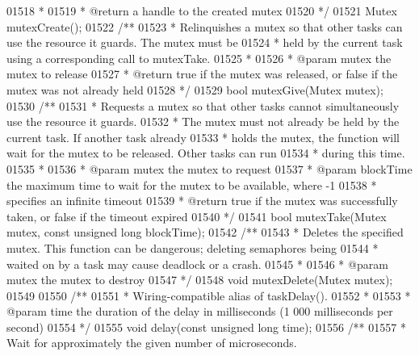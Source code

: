 \begin{DoxyCode}
{{{{{{{{{01518 \textcolor{comment}{ *}
01519 \textcolor{comment}{ * @return a handle to the created mutex}
01520 \textcolor{comment}{ */}
01521 Mutex mutexCreate();
01522 \textcolor{comment}{/**}
01523 \textcolor{comment}{ * Relinquishes a mutex so that other tasks can use the resource it guards. The mutex must be}
01524 \textcolor{comment}{ * held by the current task using a corresponding call to mutexTake.}
01525 \textcolor{comment}{ *}
01526 \textcolor{comment}{ * @param mutex the mutex to release}
01527 \textcolor{comment}{ * @return true if the mutex was released, or false if the mutex was not already held}
01528 \textcolor{comment}{ */}
01529 \textcolor{keywordtype}{bool} mutexGive(Mutex mutex);
01530 \textcolor{comment}{/**}
01531 \textcolor{comment}{ * Requests a mutex so that other tasks cannot simultaneously use the resource it guards.}
01532 \textcolor{comment}{ * The mutex must not already be held by the current task. If another task already}
01533 \textcolor{comment}{ * holds the mutex, the function will wait for the mutex to be released. Other tasks can run}
01534 \textcolor{comment}{ * during this time.}
01535 \textcolor{comment}{ *}
01536 \textcolor{comment}{ * @param mutex the mutex to request}
01537 \textcolor{comment}{ * @param blockTime the maximum time to wait for the mutex to be available, where -1}
01538 \textcolor{comment}{ * specifies an infinite timeout}
01539 \textcolor{comment}{ * @return true if the mutex was successfully taken, or false if the timeout expired}
01540 \textcolor{comment}{ */}
01541 \textcolor{keywordtype}{bool} mutexTake(Mutex mutex, \textcolor{keyword}{const} \textcolor{keywordtype}{unsigned} \textcolor{keywordtype}{long} blockTime);
01542 \textcolor{comment}{/**}
01543 \textcolor{comment}{ * Deletes the specified mutex. This function can be dangerous; deleting semaphores being}
01544 \textcolor{comment}{ * waited on by a task may cause deadlock or a crash.}
01545 \textcolor{comment}{ *}
01546 \textcolor{comment}{ * @param mutex the mutex to destroy}
01547 \textcolor{comment}{ */}
01548 \textcolor{keywordtype}{void} mutexDelete(Mutex mutex);
01549 
01550 \textcolor{comment}{/**}
01551 \textcolor{comment}{ * Wiring-compatible alias of taskDelay().}
01552 \textcolor{comment}{ *}
01553 \textcolor{comment}{ * @param time the duration of the delay in milliseconds (1 000 milliseconds per second)}
01554 \textcolor{comment}{ */}
01555 \textcolor{keywordtype}{void} delay(\textcolor{keyword}{const} \textcolor{keywordtype}{unsigned} \textcolor{keywordtype}{long} time);
01556 \textcolor{comment}{/**}
01557 \textcolor{comment}{ * Wait for approximately the given number of microseconds.}
}}}}}}}}}
\end{DoxyCode}
